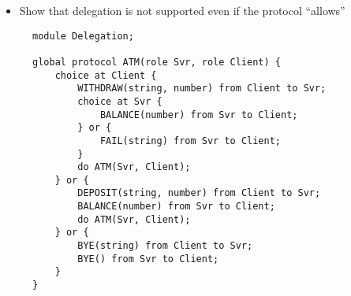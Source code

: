 \begin{itemize}
\item Show that delegation is not supported
even if the protocol ``allows''
\end{itemize}

\begin{figure}[!ht]
\begin{lstlisting}[language=Scribble, tabsize=2]
module Delegation;

global protocol ATM(role Svr, role Client) {
	choice at Client {
		WITHDRAW(string, number) from Client to Svr;
		choice at Svr {
			BALANCE(number) from Svr to Client;		
		} or {
			FAIL(string) from Svr to Client;		
		}
		do ATM(Svr, Client);
	} or {
		DEPOSIT(string, number) from Client to Svr;
		BALANCE(number) from Svr to Client;
		do ATM(Svr, Client);
	} or {
		BYE(string) from Client to Svr;
		BYE() from Svr to Client;	
	}
}
\end{lstlisting}
\label{lst:atm}
\end{figure}

